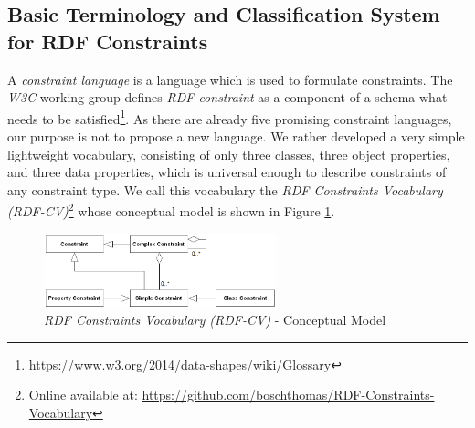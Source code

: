 \documentclass[a4paper,fontsize=11pt]{scrartcl}
\begin{document}
\subsection{Basic Terminology and Classification System for RDF Constraints}

A \emph{constraint language} is a language which is used to formulate constraints.
The \emph{W3C} working group defines \emph{RDF constraint} as a component of a schema what needs to be satisfied\footnote{\url{https://www.w3.org/2014/data-shapes/wiki/Glossary}}.
As there are already five promising constraint languages, 
our purpose is not to propose a new language.
We rather developed a very simple lightweight vocabulary,
consisting of only three classes, three object properties, and three data properties, 
which is universal enough to describe constraints of any constraint type.
We call this vocabulary the \emph{RDF Constraints Vocabulary (RDF-CV)}\footnote{Online available at: \url{https://github.com/boschthomas/RDF-Constraints-Vocabulary}} whose conceptual model is shown in Figure \ref{fig:RDF-CV-conceptual-model}.
\begin{figure}
	\centering
		\includegraphics[width=0.60\textwidth]{images/RDF-CV-conceptual-model.png}
	\caption{\emph{RDF Constraints Vocabulary (RDF-CV)} - Conceptual Model}
	\label{fig:RDF-CV-conceptual-model}
\end{figure}
\end{document}
